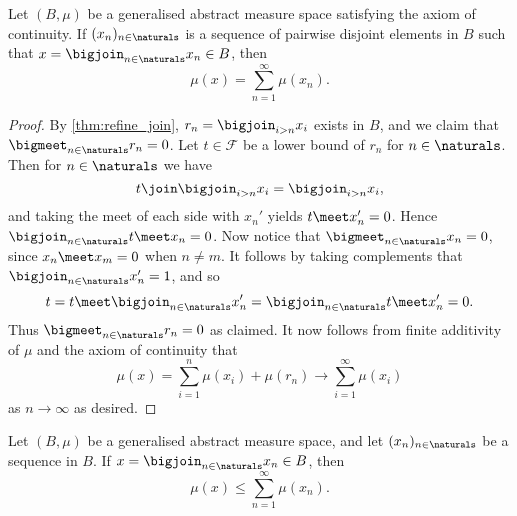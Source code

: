 \documentclass[article, a4paper, 11pt, oneside]{memoir}
\numberwithin{equation}{chapter}
\newcommand{\calF}{\mathcal{F}}
\begin{document}
\begin{proposition}
    \label{thm:generalised-addition}
    Let $(B, \mu)$ be a generalised abstract measure space satisfying the axiom of continuity. If $(x_n)_{n\in\naturals}$ is a sequence of pairwise disjoint elements in $B$ such that $x = \bigjoin_{n\in\naturals} x_n \in B$, then
    \begin{equation*}
        \mu(x)
            = \sum_{n=1}^\infty \mu(x_n).
    \end{equation*}
\end{proposition}

\begin{proof}
    By \cref{thm:refine_join}, $r_n = \bigjoin_{i > n} x_i$ exists in $B$, and we claim that $\bigmeet_{n\in\naturals} r_n = 0$. Let $t \in \calF$ be a lower bound of $r_n$ for $n \in \naturals$. Then for $n \in \naturals$ we have
    \begin{equation*}
        t \join \bigjoin_{i > n} x_i
            = \bigjoin_{i > n} x_i,
    \end{equation*}
    and taking the meet of each side with $x_n'$ yields $t \meet x_n' = 0$. Hence $\bigjoin_{n\in\naturals} t \meet x_n = 0$. Now notice that $\bigmeet_{n\in\naturals} x_n = 0$, since $x_n \meet x_m = 0$ when $n \neq m$. It follows by taking complements that $\bigjoin_{n\in\naturals} x_n' = 1$, and so
    \begin{equation*}
        t
            = t \meet \bigjoin_{n\in\naturals} x_n'
            = \bigjoin_{n\in\naturals} t \meet x_n'
            = 0.
    \end{equation*}
    Thus $\bigmeet_{n\in\naturals} r_n = 0$ as claimed. It now follows from finite additivity of $\mu$ and the axiom of continuity that
    \begin{equation*}
        \mu(x)
            = \sum_{i=1}^n \mu(x_i) + \mu(r_n)
            \to \sum_{i=1}^\infty \mu(x_i)
    \end{equation*}
    as $n \to \infty$ as desired.
\end{proof}


\begin{proposition}
    Let $(B,\mu)$ be a generalised abstract measure space, and let $(x_n)_{n\in\naturals}$ be a sequence in $B$. If $x = \bigjoin_{n\in\naturals} x_n \in B$, then
    \begin{equation*}
        \mu(x)
            \leq \sum_{n=1}^\infty \mu(x_n).
    \end{equation*}
\end{proposition}
\end{document}
